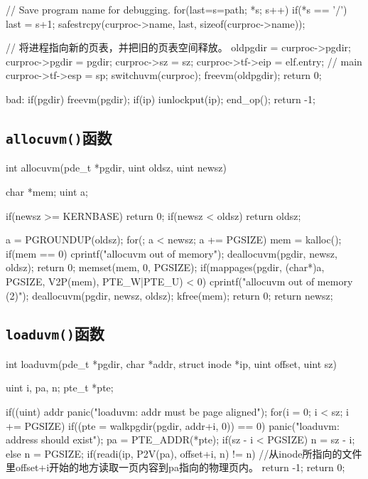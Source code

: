 \documentclass{swfcthesismscctex}
\begin{document}
\begin{ccode}
{  // Save program name for debugging.
  for(last=s=path; *s; s++)
    if(*s == '/')
      last = s+1;
  safestrcpy(curproc->name, last, sizeof(curproc->name));

  // 将进程指向新的页表，并把旧的页表空间释放。
  oldpgdir = curproc->pgdir;
  curproc->pgdir = pgdir;
  curproc->sz = sz;
  curproc->tf->eip = elf.entry;  // main
  curproc->tf->esp = sp;
  switchuvm(curproc);
  freevm(oldpgdir);
  return 0;

 bad:
  if(pgdir)
    freevm(pgdir);
  if(ip){
    iunlockput(ip);
    end_op();
  }
  return -1;
}
\end{ccode}

\subsection{\texttt{allocuvm()}函数}
\label{sec:allocuvm}

\begin{ccode}
int
allocuvm(pde_t *pgdir, uint oldsz, uint newsz)
{
  char *mem;
  uint a;

  if(newsz >= KERNBASE)
    return 0;
  if(newsz < oldsz)
    return oldsz;

  a = PGROUNDUP(oldsz);
  for(; a < newsz; a += PGSIZE){
    mem = kalloc();
    if(mem == 0){
      cprintf("allocuvm out of memory\n");
      deallocuvm(pgdir, newsz, oldsz);
      return 0;
    }
    memset(mem, 0, PGSIZE);
    if(mappages(pgdir, (char*)a, PGSIZE, V2P(mem), PTE_W|PTE_U) < 0){
      cprintf("allocuvm out of memory (2)\n");
      deallocuvm(pgdir, newsz, oldsz);
      kfree(mem);
      return 0;
    }
  }
  return newsz;
}
\end{ccode}

\subsection{\texttt{loaduvm()}函数}
\label{sec:loaduvm}

\begin{ccode}
int
loaduvm(pde_t *pgdir, char *addr, struct inode *ip, uint offset, uint sz)
{
  uint i, pa, n;
  pte_t *pte;

  if((uint) addr %
    panic("loaduvm: addr must be page aligned");
  for(i = 0; i < sz; i += PGSIZE){
    if((pte = walkpgdir(pgdir, addr+i, 0)) == 0)
      panic("loaduvm: address should exist");
    pa = PTE_ADDR(*pte);
    if(sz - i < PGSIZE)
      n = sz - i;
    else
      n = PGSIZE;
    if(readi(ip, P2V(pa), offset+i, n) != n) //从inode所指向的文件里offset+i开始的地方读取一页内容到pa指向的物理页内。
      return -1;
  }
  return 0;
}
\end{ccode}
\end{document}
